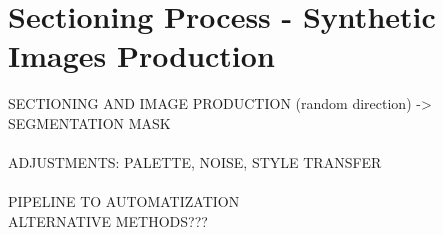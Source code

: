 \section{Sectioning Process - Synthetic Images Production} \label{ssec:sectioning}


SECTIONING AND IMAGE PRODUCTION (random direction) -> SEGMENTATION MASK\\
\\
ADJUSTMENTS: PALETTE, NOISE, STYLE TRANSFER\\
\\
PIPELINE TO AUTOMATIZATION\\
ALTERNATIVE METHODS???\\
